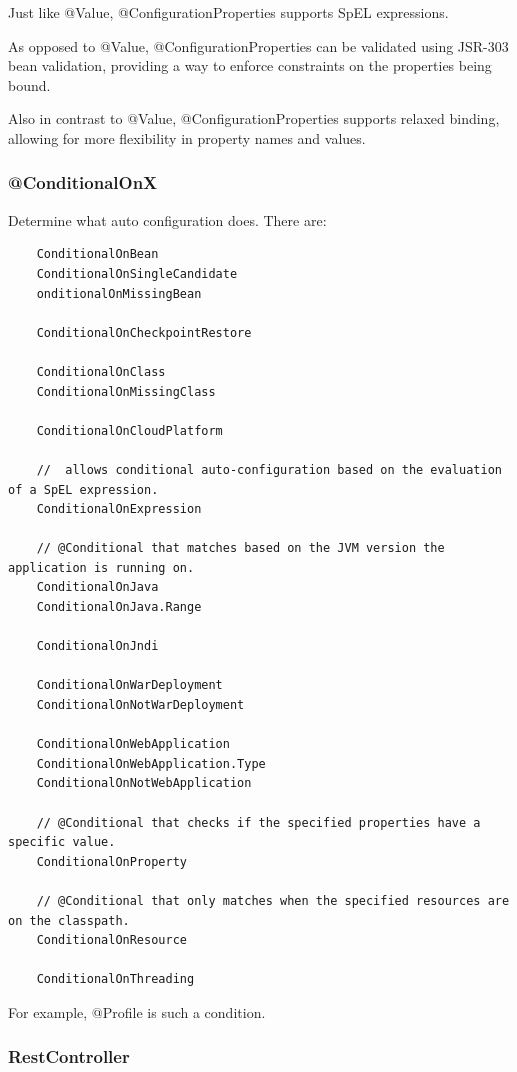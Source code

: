 \documentclass{scrartcl}
\begin{document}
Just like @Value, @ConfigurationProperties supports SpEL expressions.

As opposed to @Value, @ConfigurationProperties can be validated using JSR-303 bean validation, providing a way to enforce constraints on the properties being bound.

Also in contrast to @Value, @ConfigurationProperties supports relaxed binding, allowing for more flexibility in property names and values.


\subsubsection{@ConditionalOnX}

Determine what auto configuration does. There are:

\begin{lstlisting}
    ConditionalOnBean
    ConditionalOnSingleCandidate
    onditionalOnMissingBean

    ConditionalOnCheckpointRestore

    ConditionalOnClass
    ConditionalOnMissingClass

    ConditionalOnCloudPlatform

    //  allows conditional auto-configuration based on the evaluation of a SpEL expression.
    ConditionalOnExpression

    // @Conditional that matches based on the JVM version the application is running on.
    ConditionalOnJava
    ConditionalOnJava.Range

    ConditionalOnJndi

    ConditionalOnWarDeployment
    ConditionalOnNotWarDeployment

    ConditionalOnWebApplication
    ConditionalOnWebApplication.Type
    ConditionalOnNotWebApplication

    // @Conditional that checks if the specified properties have a specific value.
    ConditionalOnProperty

    // @Conditional that only matches when the specified resources are on the classpath.
    ConditionalOnResource

    ConditionalOnThreading

\end{lstlisting}



For example, @Profile is such a condition.

\subsubsection{RestController}
\end{document}
